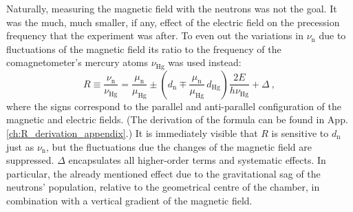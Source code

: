 Naturally, measuring the magnetic field with the neutrons was not the goal. It was the much, much smaller, if any, effect of the electric field on the precession frequency that the experiment was after. To even out the variations in $\nu_\text{n}$ due to fluctuations of the magnetic field its ratio to the frequency of the comagnetometer's mercury atoms $\nu_\text{Hg}$ was used instead:
\begin{equation}
  \label{eq:Rdefinition}
  R \equiv \frac{\nu_\text{n}}{\nu_\text{Hg}} = \frac{\mu_\text{n}}{\mu_\text{Hg}} \pm \left( d_\text{n} \mp \frac{\mu_\text{n}}{\mu_\text{Hg}} \, d_\text{Hg} \right) \frac{2 E}{ h  \nu_\text{Hg}} + \Delta \ ,
\end{equation}
where the signs correspond to the parallel and anti-parallel configuration of the magnetic and electric fields. (The derivation of the formula can be found in App.\,\ref{ch:R_derivation_appendix}.)
It is immediately visible that $R$ is sensitive to $d_\text{n}$ just as $\nu_\text{n}$, but the fluctuations due the changes of the magnetic field are suppressed.
$\Delta$ encapsulates all higher-order terms and systematic effects. In particular, the already mentioned effect due to the gravitational sag of the neutrons' population, relative to the geometrical centre of the chamber, in combination with a vertical gradient of the magnetic field.



